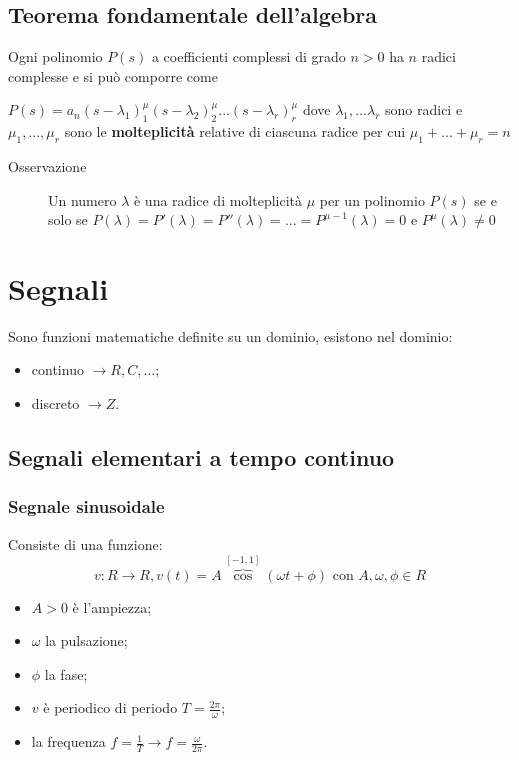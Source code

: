 \documentclass[a4paper, 12pt]{book}
\theoremstyle{plain}
\begin{document}
 \section{Teorema fondamentale dell'algebra}
 Ogni polinomio $P(s)$ a coefficienti complessi di grado $n>0$ ha $n$ radici complesse e si può comporre come
 \begin{center}
         $P(s) = a_n(s-\lambda_1)^\mu_1(s-\lambda_2)^\mu_2...(s-\lambda_r)^\mu_r$ dove 
        $\lambda_1,...\lambda_r$ sono radici  e $\mu_1,...,\mu_r$ sono le \textbf{molteplicità} relative di ciascuna
        radice per cui $\mu_1 + ... + \mu_r = n$
 \end{center}
 \begin{description}
     \item[Osservazione] Un numero $\lambda$ è una radice di molteplicità $\mu$ per un polinomio $P(s)$
    se e solo se $P(\lambda)=P'(\lambda)=P''(\lambda)=...=P^{\mu - 1}(\lambda) = 0$ e $P^\mu (\lambda)\neq 0$
    \end{description}

\chapter{Segnali}

Sono funzioni matematiche definite su un dominio, esistono nel dominio:
\begin{itemize}
    \item continuo $\rightarrow R, C, \dots$;
    \item discreto $\rightarrow Z$.
\end{itemize}

\section{Segnali elementari a tempo continuo}
\subsection{Segnale sinusoidale}
Consiste di una funzione:
\[
v: R \rightarrow R, v(t) = A \overbrace{\cos}^{[-1, 1]}(\omega t + \phi)
\textrm{ con } A, \omega, \phi \in R 
\]
\begin{itemize}
    \item $A > 0$ è l'ampiezza;
    \item $\omega$ la pulsazione;
    \item $\phi$ la fase;
    \item $v$ è periodico di periodo $T = \frac{2\pi}{\omega}$;
    \item la frequenza $f = \frac{1}{T} \rightarrow f = \frac{\omega}{2\pi}$.
\end{itemize}
\end{document}
